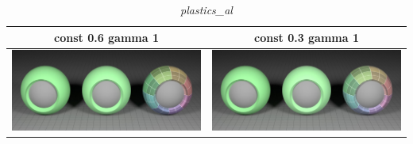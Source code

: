 \documentclass[11pt]{article}
\begin{document}
\begin{table}[ht]
  \centering
  \begin{tabular}{ | c | c | }
    \hline
    const 0.6 gamma 1 & const 0.3 gamma 1 \\ \hline
    \begin{minipage}{.3\textwidth}
      \includegraphics[scale=0.1]{img/obj/plastics_al/plastics_al_disney_dc03_dg1.jpg}
    \end{minipage}
    &
    \begin{minipage}{.3\textwidth}
      \includegraphics[scale=0.1]{img/obj/plastics_al/plastics_al_disney_dg1.jpg}
    \end{minipage}
    \\ \hline
  \end{tabular}
  \caption{\textit{plastics\_al}}\label{tbl:myLboro}
\end{table}
\end{document}
